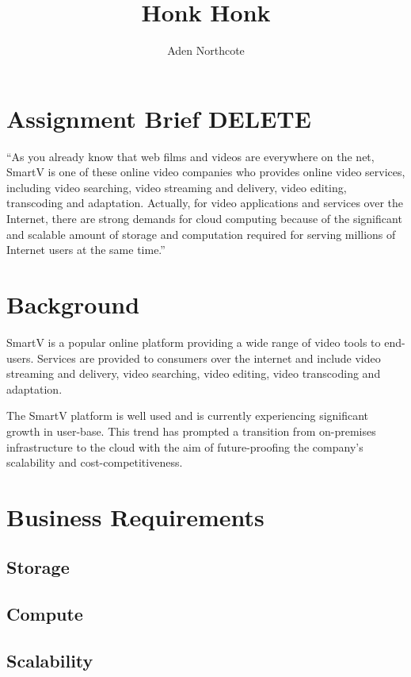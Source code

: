 \documentclass[]{article}
\title{Honk Honk}
\author{Aden Northcote}
\date{}
\begin{document}
    
\maketitle

\section{Assignment Brief DELETE}
``As you already know that web films and videos are everywhere on the net, SmartV is one of these online
video companies who provides online video services, including video searching, video streaming and
delivery, video editing, transcoding and adaptation. Actually, for video applications and services over the Internet, there are strong demands for cloud computing because of the significant and scalable amount of storage and computation required for serving millions of Internet users at the same time.''
 
\section{Background}

SmartV is a popular online platform providing a wide range of video tools to end-users. Services are provided to consumers over the internet and include video streaming and delivery, video searching, video editing, video transcoding and adaptation.

The SmartV platform is well used and is currently experiencing significant growth in user-base. This trend has prompted a transition from on-premises infrastructure to the cloud with the aim of future-proofing the company's scalability and cost-competitiveness.
 
\section{Business Requirements}

\subsection{Storage}

\subsection{Compute}

\subsection{Scalability}
\end{document}
